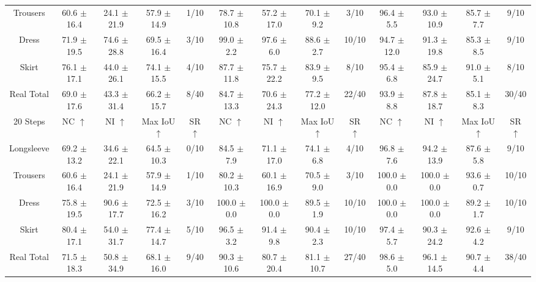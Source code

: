 \documentclass[journal]{IEEEtran}
\begin{document}
\begin{table}[t!]
{\begin{tabular}{c|cccc|cccc||cccc}
Trousers & 60.6 $\pm$ 16.4 & 24.1 $\pm$ 21.9 & 57.9 $\pm$ 14.9 & 1/10 & 78.7 $\pm$ 10.8 & \cellcolor{gray!25} 57.2 $\pm$ 17.0 & 70.1 $\pm$ 9.2 & 3/10 & 96.4 $\pm$ 5.5 & 93.0 $\pm$ 10.9 & 85.7 $\pm$ 7.7 & 9/10 \\
Dress & 71.9 $\pm$ 19.5 & 74.6 $\pm$ 28.8 & 69.5 $\pm$ 16.4 & 3/10 & 99.0 $\pm$ 2.2 & \cellcolor{gray!25} 97.6 $\pm$ 6.0 & 88.6 $\pm$ 2.7 & 10/10 & 94.7 $\pm$ 12.0 & 91.3 $\pm$ 19.8 & 85.3 $\pm$ 8.5 & 9/10 \\
Skirt & 76.1 $\pm$ 17.1 & 44.0 $\pm$ 26.1 & 74.1 $\pm$ 15.5 & 4/10 & 87.7 $\pm$ 11.8 & 75.7 $\pm$ 22.2 & 83.9 $\pm$ 9.5 & 8/10 & 95.4 $\pm$ 6.8 & 85.9 $\pm$ 24.7 & 91.0 $\pm$ 5.1 & 8/10 \\
\hline
Real Total & 69.0 $\pm$ 17.6 & 43.3 $\pm$ 31.4 & 66.2 $\pm$ 15.7 & 8/40 & 84.7 $\pm$ 13.3 & 70.6 $\pm$ 24.3 & 77.2 $\pm$ 12.0 & 22/40 & 93.9 $\pm$ 8.8 & 87.8 $\pm$ 18.7 & 85.1 $\pm$ 8.3 & 30/40 \\
\hline
\hline
20 Steps 
& NC $\uparrow$  & NI $\uparrow$ & Max IoU $\uparrow$    & SR  $\uparrow$ 
& NC $\uparrow$  & NI $\uparrow$ & Max IoU $\uparrow$     & SR  $\uparrow$ 
& NC $\uparrow$  & NI $\uparrow$ & Max IoU $\uparrow$    & SR  $\uparrow$ \\
\hline
Longsleeve & 69.2 $\pm$ 13.2 & 34.6 $\pm$ 22.1 & 64.5 $\pm$ 10.3 & 0/10 & \cellcolor{yellow!25} 84.5 $\pm$ 7.9 & \cellcolor{yellow!25} 71.1 $\pm$ 17.0 & 74.1 $\pm$ 6.8 & 4/10 & 96.8 $\pm$ 7.6 & 94.2 $\pm$ 13.9 & 87.6 $\pm$ 5.8 & 9/10 \\
Trousers & 60.6 $\pm$ 16.4 & 24.1 $\pm$ 21.9 & 57.9 $\pm$ 14.9 & 1/10 & 80.2 $\pm$ 10.3 & 60.1 $\pm$ 16.9 & 70.5 $\pm$ 9.0 & 3/10 & 100.0 $\pm$ 0.0 & 100.0 $\pm$ 0.0 & 93.6 $\pm$ 0.7 & 10/10 \\
Dress & 75.8 $\pm$ 19.5 & 90.6 $\pm$ 17.7 & 72.5 $\pm$ 16.2 & 3/10 & 100.0 $\pm$ 0.0 & 100.0 $\pm$ 0.0 & 89.5 $\pm$ 1.9 & 10/10 & 100.0 $\pm$ 0.0 & 100.0 $\pm$ 0.0 & 89.2 $\pm$ 1.7 & 10/10 \\
Skirt & 80.4 $\pm$ 17.1 & 54.0 $\pm$ 31.7 & 77.4 $\pm$ 14.7 & 5/10 & 96.5 $\pm$ 3.2 & 91.4 $\pm$ 9.8 & 90.4 $\pm$ 2.3 & 10/10 & 97.4 $\pm$ 5.7 & 90.3 $\pm$ 24.2 & 92.6 $\pm$ 4.2 & 9/10 \\
\hline
Real Total & 71.5 $\pm$ 18.3 & 50.8 $\pm$ 34.9 & 68.1 $\pm$ 16.0 & 9/40 & 90.3 $\pm$ 10.6 & 80.7 $\pm$ 20.4 & 81.1 $\pm$ 10.7 & 27/40 & 98.6 $\pm$ 5.0 & 96.1 $\pm$ 14.5 & 90.7 $\pm$ 4.4 & 38/40 \\
\bottomrule
\end{tabular}
}
\end{table}
\end{document}

